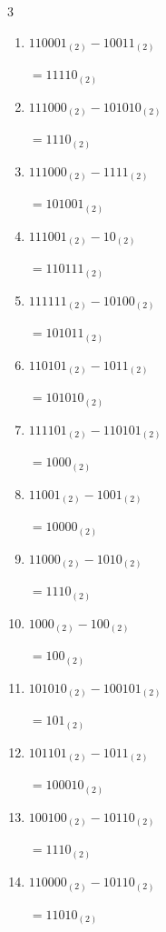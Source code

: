 \begin{multicols}{3}
\begin{enumerate}
        $=100000_{(2)}$

  \item $110001_{(2)} - 10011_{(2)}$

        $=11110_{(2)}$

  \item $111000_{(2)} - 101010_{(2)}$

        $=1110_{(2)}$

  \item $111000_{(2)} - 1111_{(2)}$

        $=101001_{(2)}$

  \item $111001_{(2)} - 10_{(2)}$

        $=110111_{(2)}$

  \item $111111_{(2)} - 10100_{(2)}$

        $=101011_{(2)}$

  \item $110101_{(2)} - 1011_{(2)}$

        $=101010_{(2)}$

  \item $111101_{(2)} - 110101_{(2)}$

        $=1000_{(2)}$

  \item $11001_{(2)} - 1001_{(2)}$

        $=10000_{(2)}$

  \item $11000_{(2)} - 1010_{(2)}$

        $=1110_{(2)}$

\columnbreak %

  \item $1000_{(2)} - 100_{(2)}$

        $=100_{(2)}$

  \item $101010_{(2)} - 100101_{(2)}$

        $=101_{(2)}$

  \item $101101_{(2)} - 1011_{(2)}$

        $=100010_{(2)}$

  \item $100100_{(2)} - 10110_{(2)}$

        $=1110_{(2)}$

  \item $110000_{(2)} - 10110_{(2)}$

        $=11010_{(2)}$


\end{enumerate}
\end{multicols}
